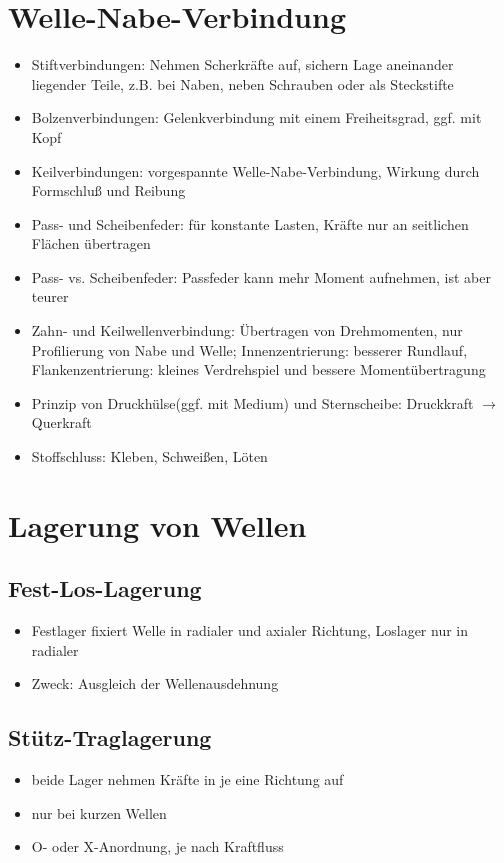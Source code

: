 \documentclass[a4paper,parskip=half*,DIV=7,fontsize=11pt]{scrartcl}
\begin{document}
\section{Welle-Nabe-Verbindung}
\begin{itemize}
	\item Stiftverbindungen: Nehmen Scherkräfte auf, sichern Lage aneinander liegender Teile, z.B. bei Naben, neben Schrauben oder als Steckstifte
	\item Bolzenverbindungen: Gelenkverbindung mit einem Freiheitsgrad, ggf. mit Kopf
	\item Keilverbindungen: vorgespannte Welle-Nabe-Verbindung, Wirkung durch Formschluß und Reibung
	\item Pass- und Scheibenfeder: für konstante Lasten, Kräfte nur an seitlichen Flächen übertragen
	\item Pass- vs. Scheibenfeder: Passfeder kann mehr Moment aufnehmen, ist aber teurer
	\item Zahn- und Keilwellenverbindung: Übertragen von Drehmomenten, nur Profilierung von Nabe und Welle; Innenzentrierung: besserer Rundlauf, Flankenzentrierung: kleines Verdrehspiel und bessere Momentübertragung
	\item Prinzip von Druckhülse(ggf. mit Medium) und Sternscheibe: Druckkraft $\rightarrow$ Querkraft
	\item Stoffschluss: Kleben, Schweißen, Löten
\end{itemize}	
	
\section{Lagerung von Wellen}
\subsection{Fest-Los-Lagerung}
\begin{itemize}
	\item Festlager fixiert Welle in radialer und axialer Richtung, Loslager nur in radialer
	\item Zweck: Ausgleich der Wellenausdehnung
\end{itemize}

	
\subsection{Stütz-Traglagerung}
\begin{itemize}
	\item beide Lager nehmen Kräfte in je eine Richtung auf
	\item nur bei kurzen Wellen
	\item O- oder X-Anordnung, je nach Kraftfluss
\end{itemize}
	
\end{document}
